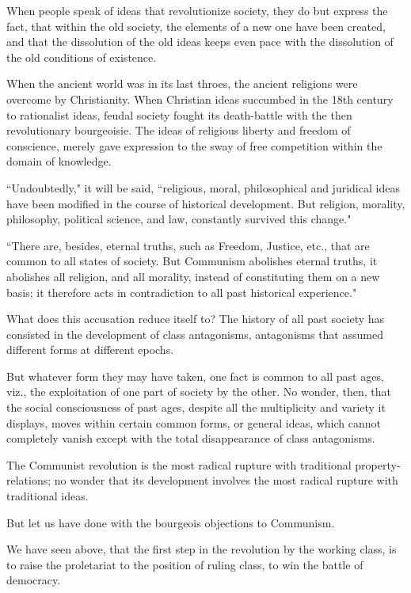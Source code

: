 When people speak of ideas that revolutionize society, they do but express the fact, that within the old society, the elements of a new one have been created, and that the dissolution of the old ideas keeps even pace with the dissolution of the old conditions of existence.

When the ancient world was in its last throes, the ancient religions were overcome by Christianity. When Christian ideas succumbed in the 18th century to rationalist ideas, feudal society fought its death-battle with the then revolutionary bourgeoisie. The ideas of religious liberty and freedom of conscience, merely gave expression to the sway of free competition within the domain of knowledge.

``Undoubtedly," it will be said, ``religious, moral, philosophical and juridical ideas have been modified in the course of historical development. But religion, morality, philosophy, political science, and law, constantly survived this change."

``There are, besides, eternal truths, such as Freedom, Justice, etc., that are common to all states of society. But Communism abolishes eternal truths, it abolishes all religion, and all morality, instead of constituting them on a new basis; it therefore acts in contradiction to all past historical experience."

What does this accusation reduce itself to? The history of all past society has consisted in the development of class antagonisms, antagonisms that assumed different forms at different epochs.

But whatever form they may have taken, one fact is common to all past ages, viz., the exploitation of one part of society by the other. No wonder, then, that the social consciousness of past ages, despite all the multiplicity and variety it displays, moves within certain common forms, or general ideas, which cannot completely vanish except with the total disappearance of class antagonisms.

The Communist revolution is the most radical rupture with traditional property-relations; no wonder that its development involves the most radical rupture with traditional ideas.

But let us have done with the bourgeois objections to Communism.

We have seen above, that the first step in the revolution by the working class, is to raise the proletariat to the position of ruling class, to win the battle of democracy.

